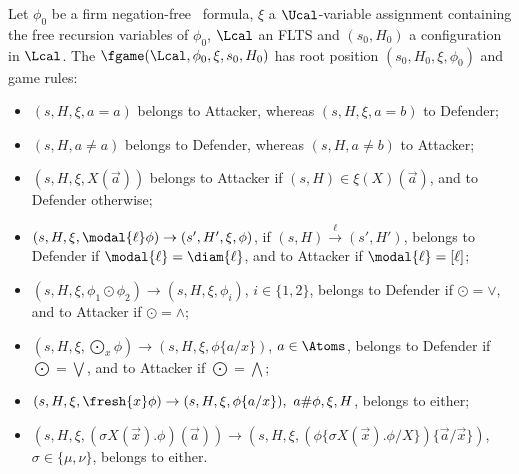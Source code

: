 \begin{definition}\label{def:parityG}
    Let $\phi_0$ be a firm negation-free \fhml\
    formula,
    $\xi$ a $\Ucal$-variable assignment containing the free recursion variables of $\phi_0$, $\Lcal$ an FLTS and $(s_0,H_0)$ a configuration in $\Lcal$.
    The \boldemph{game} $\fgame(\Lcal, \phi_0, \xi, s_0, H_0)$ has root position $(s_0, H_0, \xi, \phi_0)$ and game rules:
    \begin{itemize}
        \item $(s,H,\xi, a = a)$ belongs to Attacker, whereas
 $(s,H,\xi, a = b)$ to Defender;
        \item $(s,H, a \neq a)$ belongs to Defender, whereas 
 $(s,H, a \neq b)$  to Attacker;
        \item $(s,H,\xi, X(\vec a))$ belongs to Attacker if $(s, H)\in \xi(X)(\vec a)$, and to Defender otherwise;
        \item $(s,H,\xi, \modal{\ell}\phi) \rightarrow (s',H',\xi, \phi)$, if $(s, H) \xrightarrow{\ell} (s', H')$, belongs to Defender if $\modal{\ell}=\diam{\ell}$, and to Attacker if $\modal{\ell}=[\ell]$;
        \item $(s,H,\xi, \phi_1 \odot \phi_2) \rightarrow (s,H,\xi,\phi_i)$, $i \in \{1,2\}$, belongs to Defender if $\odot=\lor$, and to Attacker if $\odot=\land$;
        \item $(s,H,\xi, \bigodot\nolimits_x \phi) \rightarrow (s,H,\xi,\phi\{a/x\})$, $a \in \Atoms$, belongs to Defender if $\bigodot=\bigvee$, and to Attacker if $\bigodot=\bigwedge$;
        \item $(s,H,\xi,\fresh{x}\phi) \rightarrow (s, H, \xi, \phi\{a/x\}),\ a \# \phi,\xi,H$, belongs to either;
        \item $(s,H,\xi, (\sigma X(\vec x).\phi)(\vec a)) \rightarrow (s, H, \xi,(\phi\{\sigma X(\vec x).\phi / X\})\{\vec a / \vec x\})$, $\sigma\in\{\mu,\nu\}$, belongs to either.

\end{itemize}
\end{definition}
